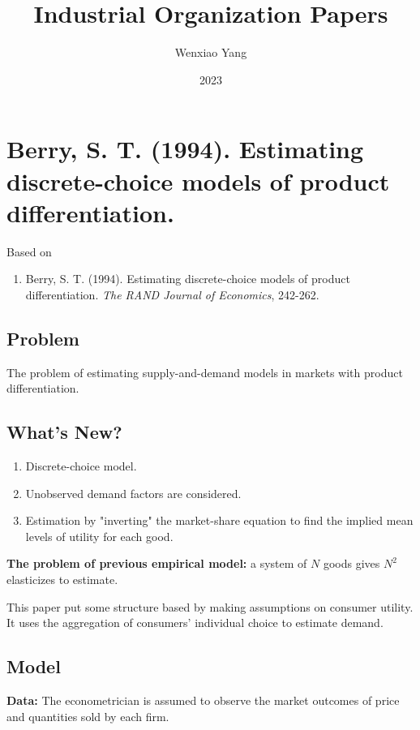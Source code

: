 \documentclass[11pt]{elegantbook}
\title{\textbf{Industrial Organization Papers}}
\author{Wenxiao Yang}
\institute{Haas School of Business, University of California Berkeley}
\date{2023}
\begin{document}
\maketitle
\frontmatter
\tableofcontents
\mainmatter


\chapter{Berry, S. T. (1994). Estimating discrete-choice models of product differentiation.}
Based on
\begin{enumerate}[$\circ$]
    \item Berry, S. T. (1994). Estimating discrete-choice models of product differentiation. \textit{The RAND Journal of Economics}, 242-262.
\end{enumerate}


\section{Problem}
The problem of estimating supply-and-demand models in markets with product differentiation.


\section{What's New?}
\begin{enumerate}
    \item Discrete-choice model.
    \item Unobserved demand factors are considered.
    \item Estimation by "inverting" the market-share equation to find the implied mean levels of utility for each good.
\end{enumerate}
\begin{note}
    \textbf{The problem of previous empirical model:} a system of $N$ goods gives $N^2$ elasticizes to estimate.
\end{note}
This paper put some structure based by making assumptions on consumer utility. It uses the aggregation of consumers' individual choice to estimate demand.

\section{Model}
\textbf{Data:} The econometrician is assumed to observe the market outcomes of price and quantities sold by each firm.
\end{document}
